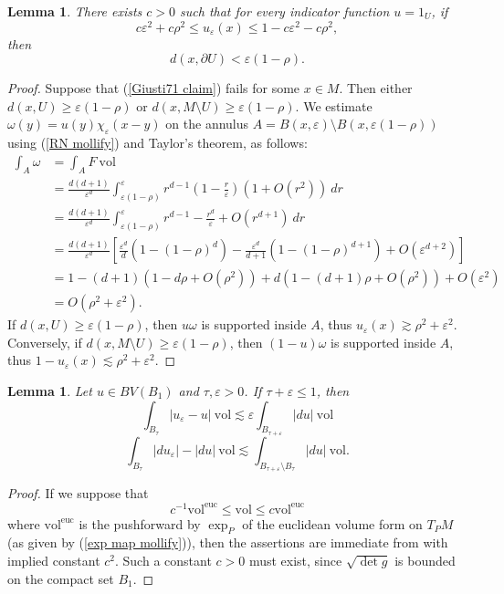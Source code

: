 \documentclass[reqno,12pt,letterpaper]{amsart}
\newcommand{\vol}{\mathrm{vol}}
\newtheorem{lemma}[theorem]{Lemma}
\theoremstyle{definition}
\numberwithin{equation}{section}
\begin{document}
\begin{lemma}\label{Giusti71}
There exists $c > 0$ such that for every indicator function $u = 1_U$, if
$$c\varepsilon^2 + c\rho^2 \leq u_\varepsilon(x) \leq 1 - c\varepsilon^2 - c\rho^2,$$
then
\begin{equation}\label{Giusti71 claim}
d(x, \partial U) < \varepsilon(1 - \rho).
\end{equation}
\end{lemma}
\begin{proof}
Suppose that (\ref{Giusti71 claim}) fails for some $x \in M$. Then either $d(x, U) \geq \varepsilon(1 - \rho)$ or $d(x, M \setminus U) \geq \varepsilon(1 - \rho)$.
We estimate $\omega(y) = u(y)\chi_\varepsilon(x - y)$ on the annulus $A = B(x, \varepsilon) \setminus B(x, \varepsilon(1 - \rho))$ using (\ref{RN mollify}) and Taylor's theorem, as follows:
\begin{align*}
\int_A \omega &= \int_A F ~\vol \\
&= \frac{d(d + 1)}{\varepsilon^d} \int_{\varepsilon(1 - \rho)}^\varepsilon r^{d - 1}\left(1 - \frac{r}{\varepsilon}\right)(1 + O(r^2)) ~dr \\
&= \frac{d(d + 1)}{\varepsilon^d} \int_{\varepsilon(1 - \rho)}^\varepsilon r^{d - 1} - \frac{r^d}{\varepsilon} + O(r^{d + 1}) ~dr\\
&= \frac{d(d + 1)}{\varepsilon^d} \left[\frac{\varepsilon^d}{d}(1 - (1 - \rho)^d) - \frac{\varepsilon^d}{d + 1}(1 - (1 - \rho)^{d + 1}) + O(\varepsilon^{d + 2})\right]\\
&= 1 - (d + 1)(1 - d\rho + O(\rho^2)) + d(1 - (d + 1)\rho + O(\rho^2)) + O(\varepsilon^2) \\
&= O(\rho^2 + \varepsilon^2).
\end{align*}
If $d(x, U) \geq \varepsilon(1 - \rho)$, then $u\omega$ is supported inside $A$, thus $u_\varepsilon(x) \gtrsim \rho^2 + \varepsilon^2$.
Conversely, if $d(x, M \setminus U) \geq \varepsilon(1 - \rho)$, then $(1 - u)\omega$ is supported inside $A$, thus $1 - u_\varepsilon(x) \lesssim \rho^2 + \varepsilon^2$.
\end{proof}

\begin{lemma}\label{Giusti72}
Let $u \in BV(B_1)$ and $\tau, \varepsilon > 0$. If $\tau + \varepsilon \leq 1$, then
$$\int_{B_\tau} |u_\varepsilon - u| ~\vol \lesssim \varepsilon \int_{B_{\tau + \varepsilon}} |du| ~\vol$$
$$\int_{B_\tau} |du_\varepsilon| - |du| ~\vol \lesssim \int_{B_{\tau + \varepsilon} \setminus B_\tau} |du| ~\vol.$$
\end{lemma}
\begin{proof}
If we suppose that
$$c^{-1} \vol^{\mathrm{euc}} \leq \vol \leq c\vol^{\mathrm{euc}}$$
where $\vol^{\mathrm{euc}}$ is the pushforward by $\exp_P$ of the euclidean volume form on $T_PM$ (as given by (\ref{exp map mollify})), then the assertions are immediate from \cite[Lemma 7.2]{Giusti77} with implied constant $c^2$.
Such a constant $c > 0$ must exist, since $\sqrt{\det g}$ is bounded on the compact set $B_1$.
\end{proof}
\end{document}
